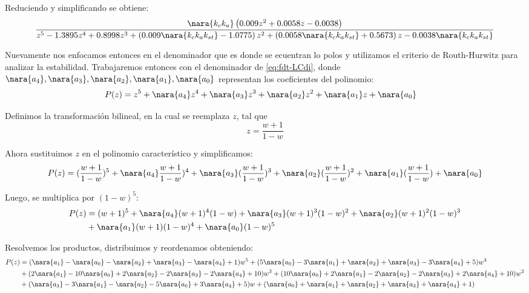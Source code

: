 Reduciendo y simplificando se obtiene:
\begin{equation}\label{eq:fdt-LCdi}
    \frac{ \nara{k_c k_a} \left( 0.009 z^2 + 0.0058 z - 0.0038 \right)}
    { z^5 -1.3895z^4 + 0.8998z^3 + \left( 0.009\nara{k_c k_a k_{st}}  -1.0775 \right) z^2 
    + \left(0.0058 \nara{k_c k_a k_{st}}   + 0.5673 \right) z 
    -0.0038 \nara{k_c k_a k_{st}} }
\end{equation}


Nuevamente nos enfocamos entonces en el denominador que es donde se ecuentran lo polos y
utilizamos el criterio de Routh-Hurwitz para analizar la estabilidad. 
Trabajaremos entonces con el denominador de \eqref{eq:fdt-LCdi}, donde $\nara{a_4},\nara{a_3},\nara{a_2},\nara{a_1},\nara{a_0}$
representan los coeficientes del polinomio:
\begin{align}
    P(z) = z^5+ \nara{a_4}z^4 +\nara{a_3}z^3 + \nara{a_2} z^2 + \nara{a_1} z + \nara{a_0} &
\end{align}

Definimos la transformación bilineal, en la cual se reemplaza $z$, tal que 
\begin{equation}
    z = \frac{w+1}{1-w}
\end{equation}

Ahora sustituimos $z$ en el polinomio característico y simplificamos:
\begin{equation}
    P(z) = (\frac{w+1}{1-w})^5 +\nara{a_4}\frac{w+1}{1-w})^4 + \nara{a_3}(\frac{w+1}{1-w})^3 + \nara{a_2} (\frac{w+1}{1-w})^2 + \nara{a_1} (\frac{w+1}{1-w}) + \nara{a_0}
\end{equation}

Luego, se multiplica por $(1-w)^5$:
\begin{align}
    P(z) &=  ({w+1})^5 +\nara{a_4}({w+1})^4(1-w)+ \nara{a_3}({w+1})^3(1-w)^2 + \nara{a_2} ({w+1})^2 (1-w)^3 \\
    &+ \nara{a_1} ({w+1})(1-w)^4+ \nara{a_0}(1-w)^5
\end{align}



Resolvemos los productos, distribuimos y reordenamos obteniendo:
\begin{align}
  P(z) &= (\nara{a_1} - \nara{a_0} - \nara{a_2} + \nara{a_3} - \nara{a_4} + 1) w^5 + (5\nara{a_0} - 3\nara{a_1} + \nara{a_2} + \nara{a_3} - 3\nara{a_4} + 5) w^4 \\
  &+ (2\nara{a_1} - 10\nara{a_0} + 2\nara{a_2} - 2\nara{a_3} - 2\nara{a_4} + 10) w^3 + (10\nara{a_0} + 2\nara{a_1} - 2\nara{a_2} - 2\nara{a_3} + 2\nara{a_4} + 10) w^2 \\
  &+ (\nara{a_3} - 3\nara{a_1} - \nara{a_2} - 5\nara{a_0} + 3\nara{a_4} + 5) w + (\nara{a_0} + \nara{a_1} + \nara{a_2} + \nara{a_3} + \nara{a_4} + 1)
\end{align}

